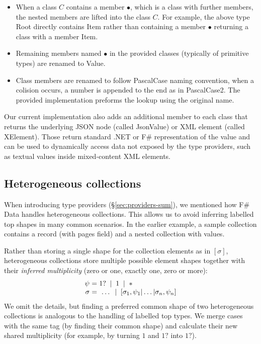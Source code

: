 \documentclass[10pt]{sigplanconf}
\newcommand{\strf}[1]{\textnormal{\textcolor{strclr}{\sffamily #1}}}
\newcommand{\ident}[1]{\textnormal{\sffamily #1}}
\newcommand{\lsep}[0]{\;\; | \;\;}
\newcommand{\narrow}[1]{\hspace{-0.7em} #1 \hspace{-0.7em}}
\begin{document}
\begin{itemize}
\item When a class $C$ contains a member $\bullet$, which is a class with further members, the
  nested members are lifted into the class $C$. For example, the above type \ident{Root}
  directly contains \ident{Item} rather than containing a member $\bullet$ returning a 
  class with a member \ident{Item}.

\item Remaining members named $\bullet$ in the provided classes (typically of primitive
  types) are renamed to \ident{Value}.
  
\item Class members are renamed to follow \ident{PascalCase} naming convention, when a 
  colision occurs, a number is appended to the end as in \ident{PascalCase2}. The provided
  implementation preforms the lookup using the original name.
\end{itemize}

Our current implementation also adds an additional member to each class that returns the
underlying JSON node (called \ident{JsonValue}) or XML element (called \ident{XElement}). 
Those return standard .NET or F\# representation of the value and can be used to dynamically 
access data not exposed by the type providers, such as textual values inside mixed-content XML elements.


\subsection{Heterogeneous collections} 
\label{sec:impl-hetero}

When introducing type providers (\S\ref{sec:providers-sum}), we mentioned how F\# Data 
handles heterogeneous collections. This allows us to avoid inferring 
labelled top shapes in many common scenarios. In the earlier example, a sample collection 
contains a record (with \strf{pages} field) and a nested collection with values.

Rather than storing a single shape for the collection elements as in $[\sigma]$, heterogeneous
collections store multiple possible element shapes together with their \emph{  inferred multiplicity} 
(zero or one, exactly one, zero or more):
%
\begin{equation*}
\begin{array}{rcl}
 \psi &\narrow{=}& 1? \lsep 1 \lsep \ast \\
 \sigma &\narrow{=}& ~\ldots \lsep [\sigma_1, \psi_1 | \ldots | \sigma_n, \psi_n ]
\end{array}
\end{equation*}
%
We omit the details, but finding a preferred common shape of two heterogeneous 
collections is analogous to the handling of labelled top types. We merge cases with the same tag (by finding 
their common shape) and calculate their new shared multiplicity (for example, by turning 
$1$ and $1?$ into $1?$).
\end{document}
